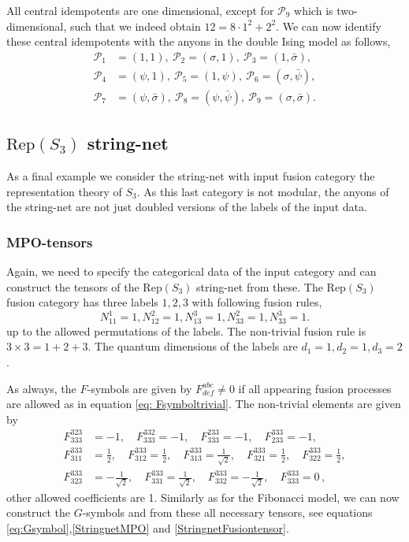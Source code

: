 \documentclass[12 pt]{article}
\begin{document}
All central idempotents are one dimensional, except for $\mathcal{P}_9$ which is two-dimensional, such that we indeed obtain $12=8 \cdot 1^2 + 2^2$. We can now identify these central idempotents with the anyons in the double Ising model as follows,
\begin{align*}
    \mathcal{P}_1 & =(1,1),\: \mathcal{P}_2=(\sigma,1),\: \mathcal{P}_3=(1,\bar{\sigma}),                           \\
    \mathcal{P}_4 & =(\psi,1),\: \mathcal{P}_5=(1,\psi),\: \mathcal{P}_6=(\sigma,\bar{\psi}),                       \\
    \mathcal{P}_7 & =(\psi,\bar{\sigma}),\: \mathcal{P}_8=(\psi,\bar{\psi}),\: \mathcal{P}_9=(\sigma,\bar{\sigma}).
\end{align*}

\subsection{$\text{Rep}(S_3)$ string-net}
As a final example we consider the string-net with input fusion category the representation theory of $S_3$. As this last category is not modular, the anyons of the string-net are not just doubled versions of the labels of the input data.

\subsubsection{MPO-tensors}
Again, we need to specify the categorical data of the input category and can construct the tensors of the $\text{Rep}(S_3)$ string-net from these. The $\text{Rep}(S_3)$ fusion category has three labels $1,2,3$ with following fusion rules,
$$
    N_{11}^1=1, N_{12}^2=1, N_{13}^3=1, N_{33}^2=1, N_{33}^3=1.
$$
up to the allowed permutations of the labels. The non-trivial fusion rule is $3 \times 3 = 1 + 2 + 3$. The quantum dimensions of the labels are $d_1=1, d_2=1, d_3=2$.


As always, the $F$-symbols are given by $F^{abc}_{def} \neq 0 $ if all appearing fusion processes are allowed as in equation \eqref{eq: Fsymboltrivial}. The non-trivial elements are given by
\begin{align*}
    F^{323}_{333} & =-1,\quad F^{332}_{333}=-1,\quad F^{233}_{333}=-1,\quad F^{333}_{233}=-1, \\
    F^{333}_{311} & =\frac{1}{2},\quad
    F^{333}_{312}=\frac{1}{2}, \quad
    F^{333}_{313}=\frac{1}{\sqrt{2}},\quad
    F^{333}_{321}=\frac{1}{2},\quad
    F^{333}_{322}=\frac{1}{2},                                                                \\
    F^{333}_{323} & =-\frac{1}{\sqrt{2}},\quad
    F^{333}_{331}=\frac{1}{\sqrt{2}},\quad
    F^{333}_{332}=-\frac{1}{\sqrt{2}},\quad
    F^{333}_{333}=0\, ,
\end{align*}
other allowed coefficients are 1. Similarly as for the Fibonacci model, we can now construct the $G$-symbols and from these all necessary tensors, see equations \eqref{eq:Gsymbol},\eqref{StringnetMPO} and \eqref{StringnetFusiontensor}.
\end{document}
